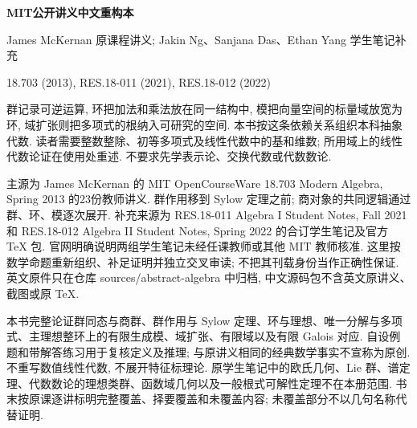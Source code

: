 \frontmatter
\begin{center}
{\color{structurecolor}\bfseries\fontsize{18}{25}\selectfont\BookTitle\par}
{\bfseries MIT公开讲义中文重构本\par}
James McKernan 原课程讲义; Jakin Ng、Sanjana Das、Ethan Yang 学生笔记补充\par
18.703 (2013), RES.18-011 (2021), RES.18-012 (2022)\par
\end{center}
\originalpreface
群记录可逆运算, 环把加法和乘法放在同一结构中, 模把向量空间的标量域放宽为环, 域扩张则把多项式的根纳入可研究的空间. 本书按这条依赖关系组织本科抽象代数. 读者需要整数整除、初等多项式及线性代数中的基和维数; 所用域上的线性代数论证在使用处重述. 不要求先学表示论、交换代数或代数数论.

主源为 James McKernan 的 MIT OpenCourseWare 18.703 Modern Algebra, Spring 2013 的23份教师讲义. 群作用移到 Sylow 定理之前; 商对象的共同逻辑通过群、环、模逐次展开. 补充来源为 RES.18-011 Algebra I Student Notes, Fall 2021 和 RES.18-012 Algebra II Student Notes, Spring 2022 的合订学生笔记及官方 TeX 包. 官网明确说明两组学生笔记未经任课教师或其他 MIT 教师核准. 这里按数学命题重新组织、补足证明并独立交叉审读; 不把其刊载身份当作正确性保证. 英文原件只在仓库 sources/abstract-algebra 中归档, 中文源码包不含英文原讲义、截图或原 TeX.

本书完整论证群同态与商群、群作用与 Sylow 定理、环与理想、唯一分解与多项式、主理想整环上的有限生成模、域扩张、有限域以及有限 Galois 对应. 自设例题和带解答练习用于复核定义及推理; 与原讲义相同的经典数学事实不宣称为原创. 不重写数值线性代数, 不展开特征标理论. 原学生笔记中的欧氏几何、Lie 群、谱定理、代数数论的理想类群、函数域几何以及一般根式可解性定理不在本册范围. 书末按原课逐讲标明完整覆盖、择要覆盖和未覆盖内容; 未覆盖部分不以几句名称代替证明.

